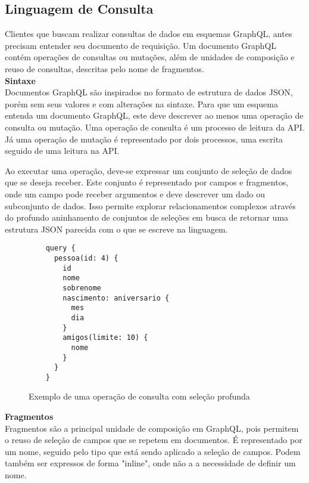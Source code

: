 \subsection[Linguagem de Consulta]{Linguagem de Consulta}

Clientes que buscam realizar consultas de dados em esquemas GraphQL, antes precisam entender seu documento de requisição. Um documento GraphQL contém operações de consultas ou mutações, além de unidades de composição e reuso de consultas, descritas pelo nome de fragmentos. \cite{GraphQL2016} \\

\textbf{Sintaxe} \\

Documentos GraphQL são inspirados no formato de estrutura de dados JSON, porém sem seus valores e com alterações na sintaxe. Para que um esquema entenda um documento GraphQL, este deve descrever ao menos uma operação de consulta ou mutação. Uma operação de consulta é um processo de leitura da API. Já uma operação de mutação é representado por dois processos, uma escrita seguido de uma leitura na API.

Ao executar uma operação, deve-se expressar um conjunto de seleção de dados que se deseja receber. Este conjunto é representado por campos e fragmentos, onde um campo pode receber argumentos e deve descrever um dado ou subconjunto de dados. Isso permite explorar relacionamentos complexos através do profundo aninhamento de conjuntos de seleções em busca de retornar uma estrutura JSON parecida com o que se escreve na linguagem.

\begin{figure}[H]
  \centering
  \begin{verbatim}
    query {
      pessoa(id: 4) {
        id
        nome
        sobrenome
        nascimento: aniversario {
          mes
          dia
        }
        amigos(limite: 10) {
          nome
        }
      }
    }
  \end{verbatim}
  \caption{Exemplo de uma operação de consulta com seleção profunda}
\end{figure}

\textbf{Fragmentos} \\

Fragmentos são a principal unidade de composição em GraphQL, pois permitem o reuso de seleção de campos que se repetem em documentos. É representado por um nome, seguido pelo tipo que está sendo aplicado a seleção de campos. Podem também ser expressos de forma "inline", onde não a a necessidade de definir um nome.

